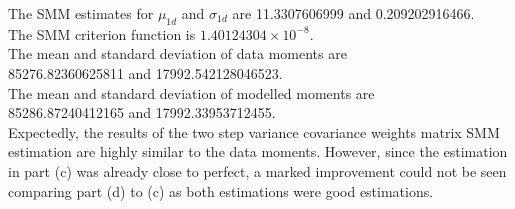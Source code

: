 \documentclass[letterpaper,12pt]{article}
\theoremstyle{definition}
\begin{document}
The SMM estimates for $\mu_{1d}$ and $\sigma_{1d}$ are 11.3307606999 and 0.209202916466.\\ 
The SMM criterion function is $1.40124304\times10^{-8}$.\\
The mean and standard deviation of data moments are\\ 85276.82360625811 and 17992.542128046523.\\
The mean and standard deviation of modelled moments are \\85286.87240412165 and 17992.33953712455.\\
Expectedly, the results of the two step variance covariance weights matrix SMM estimation are highly similar to the data moments. However, since the estimation in part (c) was already close to perfect, a marked improvement could not be seen comparing part (d) to (c) as both estimations were good estimations. 
\end{document}
